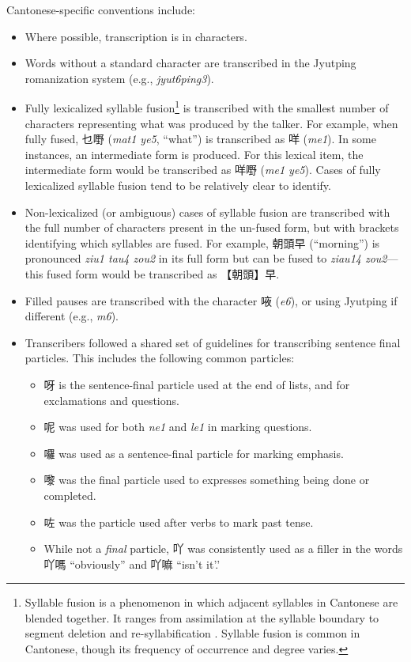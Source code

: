 Cantonese-specific conventions include:
\begin{itemize}
 \item Where possible, transcription is in characters.
 \item Words without a standard character are transcribed in the Jyutping romanization system (e.g., \textit{jyut6ping3}).
 \item Fully lexicalized syllable fusion\footnote{Syllable fusion is a phenomenon in which adjacent syllables in Cantonese are blended together. It ranges from assimilation at the syllable boundary to segment deletion and re-syllabification \citep{wong_2006_fusion}. Syllable fusion is common in Cantonese, though its frequency of occurrence and degree varies.} is transcribed with the smallest number of characters representing what was produced by the talker. For example, when fully fused, 乜嘢 (\textit{mat1 ye5}, ``what'') is transcribed as 咩 (\textit{me1}). In some instances, an intermediate form is produced. For this lexical item, the intermediate form would be transcribed as 咩嘢 (\textit{me1 ye5}). Cases of fully lexicalized syllable fusion tend to be relatively clear to identify.
 \item Non-lexicalized (or ambiguous) cases of syllable fusion are transcribed with the full number of characters present in the un-fused form, but with brackets identifying which syllables are fused. For example,  朝頭早 (``morning'') is pronounced \textit{ziu1 tau4 zou2} in its full form but can be fused to \textit{ziau14 zou2}---this fused form would be transcribed as 【朝頭】早. 
 \item Filled pauses are transcribed with the character 㖡 (\textit{e6}), or using Jyutping if different (e.g., \textit{m6}). 
 \item Transcribers followed a shared set of guidelines for transcribing sentence final particles. This includes the following common particles:
    \begin{itemize}
      \item 呀 is the sentence-final particle used at the end of lists, and for exclamations and questions.
      \item 呢 was used for both \textit{ne1} and \textit{le1} in marking questions.
      \item 囉 was used as a sentence-final particle for marking emphasis.
      \item 嚟 was the final particle used to expresses something being done or completed.
      \item 咗 was the particle used after verbs to mark past tense.
      \item While not a \textit{final} particle, 吖 was consistently used as a filler in the words 吖嗎 ``obviously'' and 吖嘛 ``isn’t it'.'
    \end{itemize}
\end{itemize}

